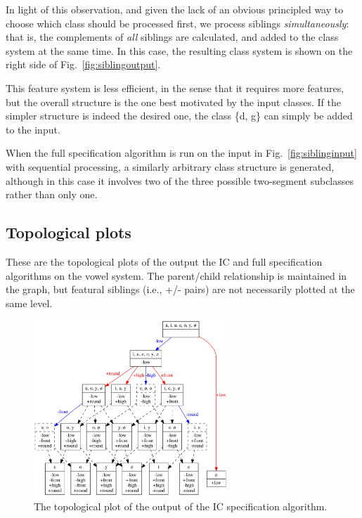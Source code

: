 \documentclass[12pt, oneside]{article}   	%
\begin{document}

In light of this observation, and given the lack of an obvious principled way to choose which class should be processed first, we process siblings \textit{simultaneously}: that is, the complements of \textit{all} siblings are calculated, and added to the class system at the same time. In this case, the resulting class system is shown on the right side of Fig.~\ref{fig:siblingoutput}.

This feature system is less efficient, in the sense that it requires more features, but the overall structure is the one best motivated by the input classes. If the simpler structure is indeed the desired one, the class \{d, g\} can simply be added to the input.

When the full specification algorithm is run on the input in Fig.~\ref{fig:siblinginput} with sequential processing, a similarly arbitrary class structure is generated, although in this case it involves two of the three possible two-segment subclasses rather than only one.

\subsection{Topological plots}
\label{app:topological}

These are the topological plots of the output the IC and full specification algorithms on the vowel system. The parent/child relationship is maintained in the graph, but featural siblings (i.e., +/- pairs) are not necessarily plotted at the same level.

\begin{figure}[htb!]
	\centering
	\includegraphics[width=0.65\textwidth]{vowel_inventory_ic_TOPOLOGICAL.png}
	\caption{The topological plot of the output of the IC specification algorithm.}
	\label{fig:vowel_inventory_ic_topological}
\end{figure}
\end{document}
